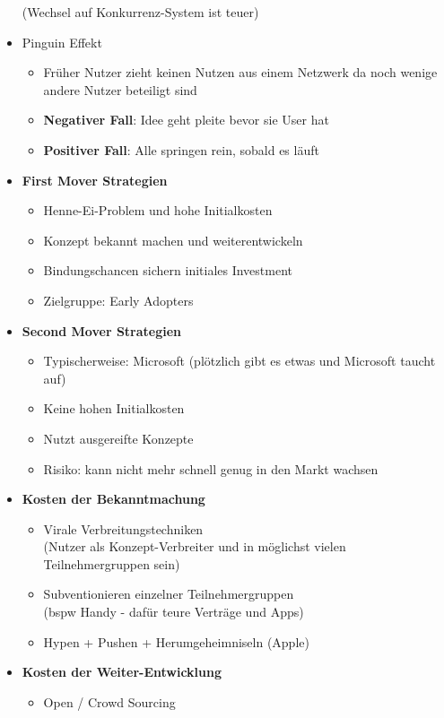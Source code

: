 \documentclass{article} %
\begin{document}
\begin{itemize}
			(Wechsel auf Konkurrenz-System ist teuer)
			\item Pinguin Effekt
				\begin{itemize}
					\item Früher Nutzer zieht keinen Nutzen aus einem Netzwerk da noch wenige andere Nutzer beteiligt sind
					\item \textbf{Negativer Fall}: Idee geht pleite bevor sie User hat
					\item \textbf{Positiver Fall}: Alle springen rein, sobald es läuft
				\end{itemize}
			\item \textbf{First Mover Strategien}
				\begin{itemize}
					\item Henne-Ei-Problem und hohe Initialkosten
					\item Konzept bekannt machen und weiterentwickeln
					\item Bindungschancen sichern initiales Investment 
					\item Zielgruppe: Early Adopters
				\end{itemize}
			\item \textbf{Second Mover Strategien}
				\begin{itemize}
					\item Typischerweise: Microsoft (plötzlich gibt es etwas und Microsoft taucht auf)
					\item Keine hohen Initialkosten
					\item Nutzt ausgereifte Konzepte
					\item Risiko: kann nicht mehr schnell genug in den Markt wachsen
				\end{itemize}
			\item \textbf{Kosten der Bekanntmachung}
			\begin{itemize}
				\item Virale Verbreitungstechniken\\
				(Nutzer als Konzept-Verbreiter und in möglichst vielen Teilnehmergruppen sein)
				\item Subventionieren einzelner Teilnehmergruppen\\
				(bspw Handy - dafür teure Verträge und Apps)
				\item Hypen + Pushen + Herumgeheimniseln (Apple)
			\end{itemize}
			\item \textbf{Kosten der Weiter-Entwicklung}
			\begin{itemize}
				\item Open / Crowd Sourcing

\end{itemize}
\end{itemize}
\end{document}
